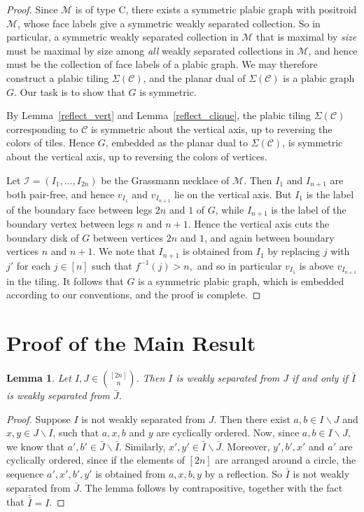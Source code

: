 \documentclass[10pt]{amsart}
\newtheorem{lemm}[theo]{Lemma}
\theoremstyle{definition}
\begin{document}
\begin{proof}
Since $\mathcal{M}$ is of type C, there exists a symmetric plabic graph with positroid $\mathcal{M}$, whose face labels give a symmetric weakly separated collection. So in particular, a symmetric weakly separated collection in $\mathcal{M}$ that is maximal by \emph{size} must be maximal by size among \emph{all} weakly separated collections in $\mathcal{M}$, and hence must be the collection of face labels of a plabic graph. We may therefore construct a plabic tiling $\Sigma(\mathcal{C})$, and the planar dual of $\Sigma(\mathcal{C})$ is a plabic graph $G$. Our task is to show that $G$ is symmetric.

By Lemma~\ref{reflect_vert} and Lemma~\ref{reflect_clique}, the plabic tiling $\Sigma(\mathcal{C})$ corresponding to $\mathcal{C}$ is symmetric about the vertical axis, up to reversing the colors of tiles. Hence $G$, embedded as the planar dual to $\Sigma(\mathcal{C})$, is symmetric about the vertical axis, up to reversing the colors of vertices. 

Let $\mathcal{I} = (I_1,\ldots,I_{2n})$ be the Grassmann necklace of $\mathcal{M}$. 
Then $I_1$ and $I_{n+1}$ are both pair-free, and hence
$v_{I_1}$ and $v_{I_{n+1}}$ lie on the vertical axis. But $I_{1}$ is the label of the boundary face between legs $2n$ and $1$ of $G$, while $I_{n+1}$ is the label of the boundary vertex between legs $n$ and $n+1$.
Hence the vertical axis cuts the boundary disk of $G$ between vertices $2n$ and $1$, and again between boundary vertices $n$ and $n+1$. We note that $I_{n+1}$ is obtained from $I_1$ by replacing $j$ with $j'$ for each 
$j \in [n]$ such that $f^{-1}(j) > n,$
and so in particular $v_{I_1}$ is above $v_{I_{n+1}}$ in the tiling. It follows that $G$ is a symmetric plabic graph, which is embedded according to our conventions, and the proof is complete. \end{proof}

\section{Proof of the Main Result}

\begin{lemm}\label{bar}
Let $I, J \in \binom{[2n]}{n}$. Then $I$ is weakly separated from $J$ if and only if $\bar{I}$ is weakly separated from $\bar{J}$.
\end{lemm}

\begin{proof}
Suppose $I$ is not weakly separated from $J$. Then there exist $a,b \in I\backslash J$ and $x,y \in J \backslash I$, such that $a,x,b$ and $y$ are cyclically ordered.
Now, since $a,b \in I \backslash J$, we know that $a',b' \in \bar{J} \backslash \bar{I}$. Similarly, $x',y' \in \bar{I} \backslash \bar{J}$. 
 Moreover, $y',b',x'$ and $a'$ are cyclically ordered, since if the elements of $[2n]$ are arranged around a circle, the sequence $a', x', b', y'$ is obtained from $a, x, b, y$ by a reflection.
So $\bar{I}$ is not weakly separated from $\bar{J}$. The lemma follows by contrapositive, together with the fact that $\bar{\bar{I}} = I$.\end{proof}
\end{document}
